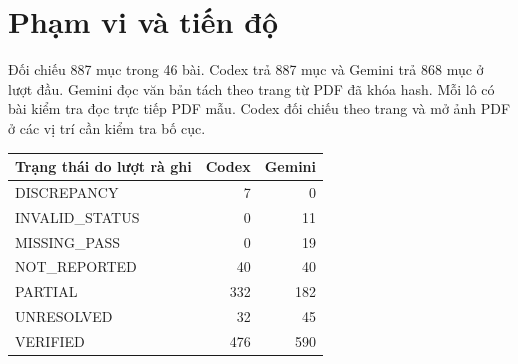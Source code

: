 \section*{Phạm vi và tiến độ}
Đối chiếu 887 mục trong 46 bài. Codex trả 887 mục và Gemini trả 868 mục ở lượt đầu.
Gemini đọc văn bản tách theo trang từ PDF đã khóa hash. Mỗi lô có bài kiểm tra đọc trực tiếp PDF mẫu. Codex đối chiếu theo trang và mở ảnh PDF ở các vị trí cần kiểm tra bố cục.
\begin{center}\begin{tabular}{lrr}\toprule Trạng thái do lượt rà ghi & Codex & Gemini \\ \midrule
DISCREPANCY & 7 & 0 \\
INVALID\_STATUS & 0 & 11 \\
MISSING\_PASS & 0 & 19 \\
NOT\_REPORTED & 40 & 40 \\
PARTIAL & 332 & 182 \\
UNRESOLVED & 32 & 45 \\
VERIFIED & 476 & 590 \\
\bottomrule\end{tabular}\end{center}
